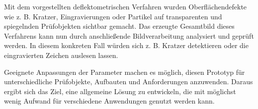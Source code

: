 \noindent
Mit dem vorgestellten deflektometrischen Verfahren wurden Oberflächen\-de\-fekte wie z. B. Kratzer, Eingravierungen oder Partikel auf transparenten und spiegelnden Prüfobjekten sichtbar gemacht.
Das erzeugte Gesamtbild dieses Verfahrens kann nun durch anschließende Bildverarbeitung analysiert und geprüft werden.
In diesem konkreten Fall würden sich z. B. Kratzer detektieren oder die eingravierten Zeichen auslesen lassen.

\p
Geeignete Anpassungen der Parameter machen es möglich, diesen Prototyp für unterschiedliche Prüfobjekte, Aufbauten und Anforderungen anzuwenden.
Daraus ergibt sich das Ziel, eine allgemeine Lösung zu entwickeln, die mit möglichst wenig Aufwand für verschiedene Anwendungen genutzt werden kann.